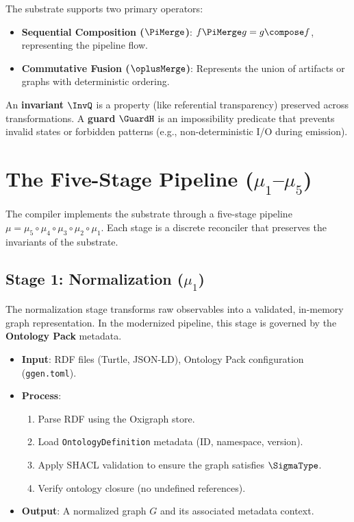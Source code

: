 \begin{definition}
The substrate supports two primary operators:
\begin{itemize}
    \item \textbf{Sequential Composition ($\PiMerge$)}: $f \PiMerge g = g \compose f$, representing the pipeline flow.
    \item \textbf{Commutative Fusion ($\oplusMerge$)}: Represents the union of artifacts or graphs with deterministic ordering.
\end{itemize}
\end{definition}

\begin{definition}
An \textbf{invariant} $\InvQ$ is a property (like referential transparency) preserved across transformations. A \textbf{guard} $\GuardH$ is an impossibility predicate that prevents invalid states or forbidden patterns (e.g., non-deterministic I/O during emission).
\end{definition}

\section{The Five-Stage Pipeline (\(\mu_1\)--\(\mu_5\))}

The compiler implements the substrate through a five-stage pipeline $\mu = \mu_5 \circ \mu_4 \circ \mu_3 \circ \mu_2 \circ \mu_1$. Each stage is a discrete reconciler that preserves the invariants of the substrate.

\subsection{Stage 1: Normalization (\(\mu_1\))}

The normalization stage transforms raw observables into a validated, in-memory graph representation. In the modernized pipeline, this stage is governed by the \textbf{Ontology Pack} metadata.

\begin{itemize}
    \item \textbf{Input}: RDF files (Turtle, JSON-LD), Ontology Pack configuration (\texttt{ggen.toml}).
    \item \textbf{Process}: 
        \begin{enumerate}
            \item Parse RDF using the Oxigraph store.
            \item Load \texttt{OntologyDefinition} metadata (ID, namespace, version).
            \item Apply SHACL validation to ensure the graph satisfies $\SigmaType$.
            \item Verify ontology closure (no undefined references).
        \end{enumerate}
    \item \textbf{Output}: A normalized graph $G$ and its associated metadata context.
\end{itemize}

